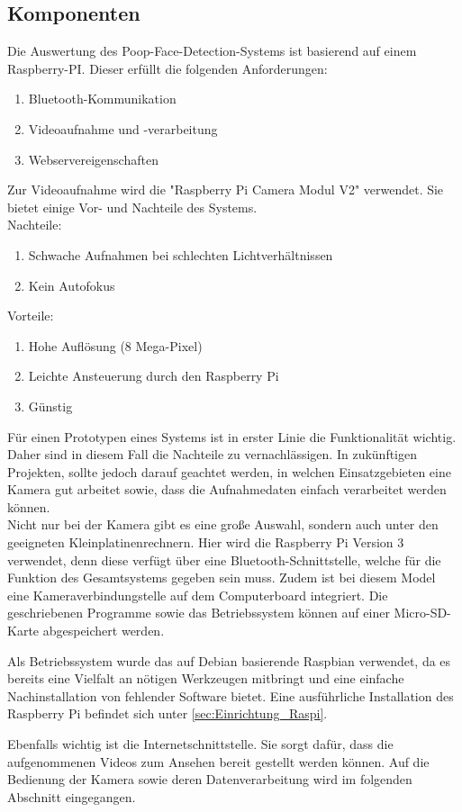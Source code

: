\subsection{Komponenten}
\label{subsec:evalsys_hardware}

Die Auswertung des Poop-Face-Detection-Systems ist basierend auf einem Raspberry-PI. Dieser erfüllt die folgenden Anforderungen:

\begin{enumerate}
\item Bluetooth-Kommunikation
\item Videoaufnahme und -verarbeitung
\item Webservereigenschaften
\end{enumerate}

Zur Videoaufnahme wird die "Raspberry Pi Camera Modul V2" verwendet. Sie bietet einige Vor- und Nachteile des Systems. \\

Nachteile:
\begin{enumerate}
\item Schwache Aufnahmen bei schlechten Lichtverhältnissen
\item Kein Autofokus
\end{enumerate}
\vspace{0.35cm}

Vorteile:
\begin{enumerate}
\item Hohe Auflösung (8 Mega-Pixel)
\item Leichte Ansteuerung durch den Raspberry Pi
\item Günstig
\end{enumerate}

Für einen Prototypen eines Systems ist in erster Linie die Funktionalität wichtig. Daher sind in diesem Fall die Nachteile zu vernachlässigen. In zukünftigen Projekten, sollte jedoch darauf geachtet werden, in welchen Einsatzgebieten eine Kamera gut arbeitet sowie, dass die Aufnahmedaten einfach verarbeitet werden können.\cite{picam_website} \\

Nicht nur bei der Kamera gibt es eine große Auswahl, sondern auch unter den geeigneten Kleinplatinenrechnern. Hier wird die Raspberry Pi Version 3 verwendet, denn diese verfügt über eine Bluetooth-Schnittstelle, welche für die Funktion des Gesamtsystems gegeben sein muss. Zudem ist bei diesem Model eine Kameraverbindungstelle auf dem Computerboard integriert. Die geschriebenen Programme sowie das Betriebssystem können auf einer Micro-SD-Karte abgespeichert werden.\cite{raspi_datenblatt}

Als Betriebssystem wurde das auf Debian basierende Raspbian verwendet, da es bereits eine Vielfalt an nötigen Werkzeugen mitbringt und eine einfache Nachinstallation von fehlender Software bietet. Eine ausführliche Installation des Raspberry Pi befindet sich unter \ref{sec:Einrichtung_Raspi}.

Ebenfalls wichtig ist die Internetschnittstelle. Sie sorgt dafür, dass die aufgenommenen Videos zum Ansehen bereit gestellt werden können. Auf die Bedienung der Kamera sowie deren Datenverarbeitung wird im folgenden Abschnitt eingegangen.
